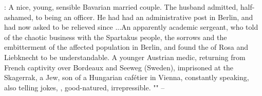 : A nice, young, sensible Bavarian married couple. The husband admitted, half-ashamed, to being an officer. He had had an administrative post in Berlin, and had now asked to be relieved since ...An apparently academic sergeant, who told of the chaotic business with the Spartakus people, the sorrows and the embitterment of the affected population in Berlin, and found the  of Rosa and Liebknecht to be understandable. A younger Austrian medic, returning from French captivity over Bordeaux and Seeweg (Sweden), imprisoned at the Skagerrak, a Jew, son of a Hungarian cafétier in Vienna, constantly speaking, also telling jokes, , good-natured, irrepressible. "" -- 

